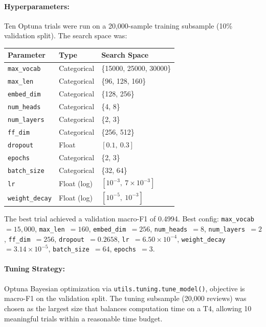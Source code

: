 \documentclass[12pt]{article}
\begin{document}
\paragraph{Hyperparameters:}
Ten Optuna trials were run on a 20,000-sample training subsample (10\% validation split). The search space was:
\begin{table}[H]
    \centering
    \begin{tabular}{lll}
        \toprule
        Parameter & Type & Search Space \\
        \midrule
        \texttt{max\_vocab} & Categorical & \{15000, 25000, 30000\} \\
        \texttt{max\_len}   & Categorical & \{96, 128, 160\} \\
        \texttt{embed\_dim} & Categorical & \{128, 256\} \\
        \texttt{num\_heads} & Categorical & \{4, 8\} \\
        \texttt{num\_layers}& Categorical & \{2, 3\} \\
        \texttt{ff\_dim}    & Categorical & \{256, 512\} \\
        \texttt{dropout}    & Float       & $[0.1,\ 0.3]$ \\
        \texttt{epochs}     & Categorical & \{2, 3\} \\
        \texttt{batch\_size}& Categorical & \{32, 64\} \\
        \texttt{lr}         & Float (log) & $[10^{-3},\ 7\times10^{-3}]$ \\
        \texttt{weight\_decay} & Float (log) & $[10^{-5},\ 10^{-3}]$ \\
        \bottomrule
    \end{tabular}
\end{table}
The best trial achieved a validation macro-F1 of 0.4994. Best config: \texttt{max\_vocab }$=15{,}000$, \texttt{max\_len }$=160$, \texttt{embed\_dim }$=256$, \texttt{num\_heads }$=8$, \texttt{num\_layers }$=2$, \texttt{ff\_dim }$=256$, \texttt{dropout }$=0.2658$, \texttt{lr }$=6.50\times10^{-4}$, \texttt{weight\_decay }$=3.14\times10^{-5}$, \texttt{batch\_size }$=64$, \texttt{epochs }$=3$.
 
\paragraph{Tuning Strategy:}
Optuna Bayesian optimization via \texttt{utils.tuning.tune\_model()}, objective is macro-F1 on the validation split. The tuning subsample (20,000 reviews) was chosen as the largest size that balances computation time on a T4, allowing 10 meaningful trials within a reasonable time budget.
 
\end{document}
